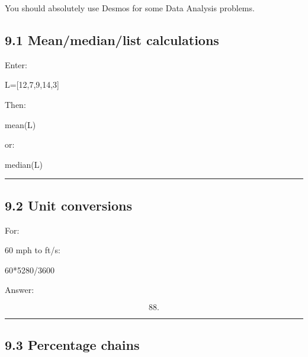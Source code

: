 \documentclass[
]{article}
\newenvironment{Shaded}{}{}
\newcommand{\NormalTok}[1]{#1}
\begin{document}
You should absolutely use Desmos for some Data Analysis problems.

\subsection{9.1 Mean/median/list
calculations}\label{meanmedianlist-calculations}

Enter:

\begin{Shaded}
\begin{Highlighting}[]
\NormalTok{L=[12,7,9,14,3]}
\end{Highlighting}
\end{Shaded}

Then:

\begin{Shaded}
\begin{Highlighting}[]
\NormalTok{mean(L)}
\end{Highlighting}
\end{Shaded}

or:

\begin{Shaded}
\begin{Highlighting}[]
\NormalTok{median(L)}
\end{Highlighting}
\end{Shaded}

\begin{center}\rule{0.5\linewidth}{0.5pt}\end{center}

\subsection{9.2 Unit conversions}\label{unit-conversions}

For:

60 mph to ft/s:

\begin{Shaded}
\begin{Highlighting}[]
\NormalTok{60*5280/3600}
\end{Highlighting}
\end{Shaded}

Answer:

\[
88.
\]

\begin{center}\rule{0.5\linewidth}{0.5pt}\end{center}

\subsection{9.3 Percentage chains}\label{percentage-chains}
\end{document}
